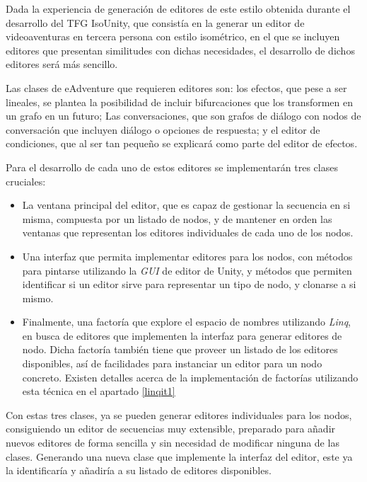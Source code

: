 Dada la experiencia de generación de editores de este estilo obtenida durante el desarrollo del TFG IsoUnity, que consistía en la generar un editor de videoaventuras en tercera persona con estilo isométrico, en el que se incluyen editores que presentan similitudes con dichas necesidades, el desarrollo de dichos editores será más sencillo.

Las clases de eAdventure que requieren editores son: los efectos, que pese a ser lineales, se plantea la posibilidad de incluir bifurcaciones que los transformen en un grafo en un futuro; Las conversaciones, que son grafos de diálogo con nodos de conversación que incluyen diálogo o opciones de respuesta; y el editor de condiciones, que al ser tan pequeño se explicará como parte del editor de efectos.

Para el desarrollo de cada uno de estos editores se implementarán tres clases cruciales:

\begin{itemize}
	\item La ventana principal del editor, que es capaz de gestionar la secuencia en si misma, compuesta por un listado de nodos, y de mantener en orden las ventanas que representan los editores individuales de cada uno de los nodos.
	
	\item Una interfaz que permita implementar editores para los nodos, con métodos para pintarse utilizando la \textit{GUI} de editor de Unity, y métodos que permiten identificar si un editor sirve para representar un tipo de nodo, y clonarse a si mismo.
	
	\item Finalmente, una factoría que explore el espacio de nombres utilizando \textit{Linq}, en busca de editores que implementen la interfaz para generar editores de nodo. Dicha factoría también tiene que proveer un listado de los editores disponibles, así de facilidades para instanciar un editor para un nodo concreto. Existen detalles acerca de la implementación de factorías utilizando esta técnica en el apartado \ref{linqit1}
\end{itemize}

Con estas tres clases, ya se pueden generar editores individuales para los nodos, consiguiendo un editor de secuencias muy extensible, preparado para añadir nuevos editores de forma sencilla y sin necesidad de modificar ninguna de las clases. Generando una nueva clase que implemente la interfaz del editor, este ya la identificaría y añadiría a su listado de editores disponibles.

